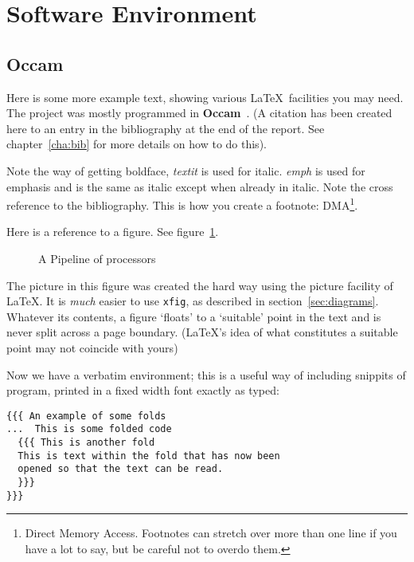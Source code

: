 \section{Software Environment}
\subsection{Occam}

Here is some more example text, showing various \LaTeX\ facilities
you may need.  The project was mostly programmed in
\textbf{Occam}~\cite{occam}.  (A citation has been created  here to an
entry in the bibliography at the end of the report. See
chapter~\ref{cha:bib} for more details on how to do this).

Note the way of getting boldface, \textit{textit} is used for italic.
\emph{emph} is used for emphasis and is the same as italic except when
already in italic.  Note the cross reference to the bibliography.
This is how you create a footnote: DMA\footnote{Direct Memory Access.
  Footnotes can stretch over more than one line if you have a lot to
  say, but be careful not to overdo them.}.

Here is a reference to a figure. See figure~\ref{pipeline}.
\begin{figure}[htbp]
  \centering
  
  \caption{A Pipeline of processors
    \label{pipeline}}           %
\end{figure}
The picture in this figure was created the hard way using the picture
facility of \LaTeX. It is \emph{much} easier to use \texttt{xfig}, as
described in section~\ref{sec:diagrams}.  Whatever its contents, a
figure `floats' to a `suitable' point in the text and is never split
across a page boundary. (\LaTeX's idea of what constitutes a suitable
point may not coincide with yours)


Now we have a verbatim environment; this is a useful way of including
snippits of program, printed in a fixed width font exactly as typed:

\begin{verbatim}
{{{ An example of some folds
...  This is some folded code
  {{{ This is another fold
  This is text within the fold that has now been
  opened so that the text can be read.
  }}}
}}}
\end{verbatim}




